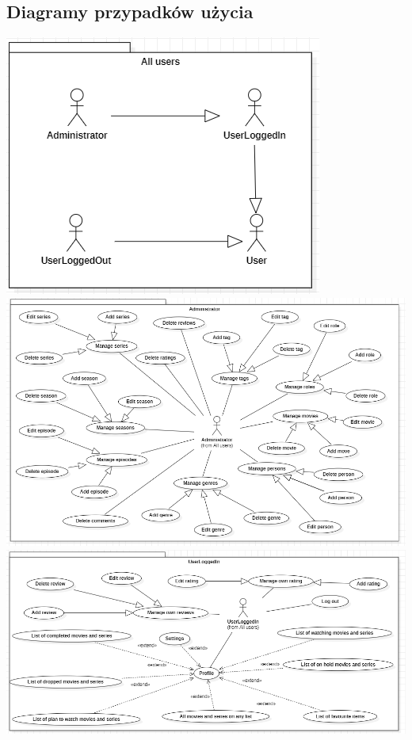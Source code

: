 \documentclass[12pt]{article}
\begin{document}
		\subsection{Diagramy przypadków użycia}
			\includegraphics[scale=0.9]{UseCase_AllUsers.png} \linebreak
			\includegraphics[scale=0.7]{UseCase_Administrator.png} \linebreak
			\includegraphics[scale=0.7]{UseCase_UserLoggedIn.png} \linebreak
\end{document}
